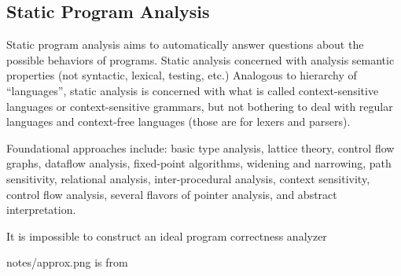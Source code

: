 \subsection{Static Program Analysis}\label{subsec:static}

Static program analysis aims to automatically answer questions about the possible behaviors of programs.
Static analysis concerned with analysis semantic properties (not syntactic, lexical, testing, etc.)
Analogous to hierarchy of “languages”, static analysis is concerned with what is called context-sensitive languages or context-sensitive grammars, but not bothering to deal with regular languages and context-free languages (those are for lexers and parsers).

Foundational approaches include: basic type analysis, lattice theory, control flow graphs, dataflow analysis, fixed-point algorithms, widening and narrowing, path sensitivity, relational analysis, inter-procedural analysis, context sensitivity, control flow analysis, several flavors of pointer analysis, and abstract interpretation.

It is impossible to construct an ideal program correctness analyzer~\cite[p. 15]{moller2023}

notes/approx.png is from

